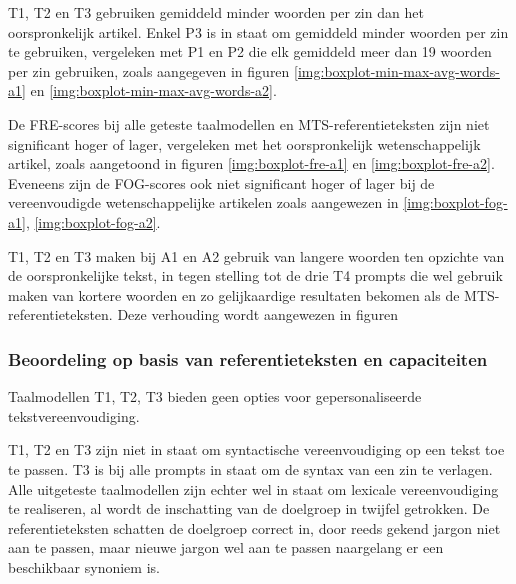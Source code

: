 \medspace

T1, T2 en T3 gebruiken gemiddeld minder woorden per zin dan het oorspronkelijk artikel. Enkel P3 is in staat om gemiddeld minder woorden per zin te gebruiken, vergeleken met P1 en P2 die elk gemiddeld meer dan 19 woorden per zin gebruiken, zoals aangegeven in figuren \ref{img:boxplot-min-max-avg-words-a1} en \ref{img:boxplot-min-max-avg-words-a2}.

\medspace

De FRE-scores bij alle geteste taalmodellen en MTS-referentieteksten zijn niet significant hoger of lager, vergeleken met het oorspronkelijk wetenschappelijk artikel, zoals aangetoond in figuren \ref{img:boxplot-fre-a1} en \ref{img:boxplot-fre-a2}. Eveneens zijn de FOG-scores ook niet significant hoger of lager bij de vereenvoudigde wetenschappelijke artikelen zoals aangewezen in \ref{img:boxplot-fog-a1}, \ref{img:boxplot-fog-a2}.

\medspace

T1, T2 en T3 maken bij A1 en A2 gebruik van langere woorden ten opzichte van de oorspronkelijke tekst, in tegen stelling tot de drie T4 prompts die wel gebruik maken van kortere woorden en zo gelijkaardige resultaten bekomen als de MTS-referentieteksten. Deze verhouding wordt aangewezen in figuren 




\subsubsection{Beoordeling op basis van referentieteksten en capaciteiten}

Taalmodellen T1, T2, T3 bieden geen opties voor gepersonaliseerde tekstvereenvoudiging. 

T1, T2 en T3 zijn niet in staat om syntactische vereenvoudiging op een tekst toe te passen. T3 is bij alle prompts in staat om de syntax van een zin te verlagen. Alle uitgeteste taalmodellen zijn echter wel in staat om lexicale vereenvoudiging te realiseren, al wordt de inschatting van de doelgroep in twijfel getrokken. De referentieteksten schatten de doelgroep correct in, door reeds gekend jargon niet aan te passen, maar nieuwe jargon wel aan te passen naargelang er een beschikbaar synoniem is. 

